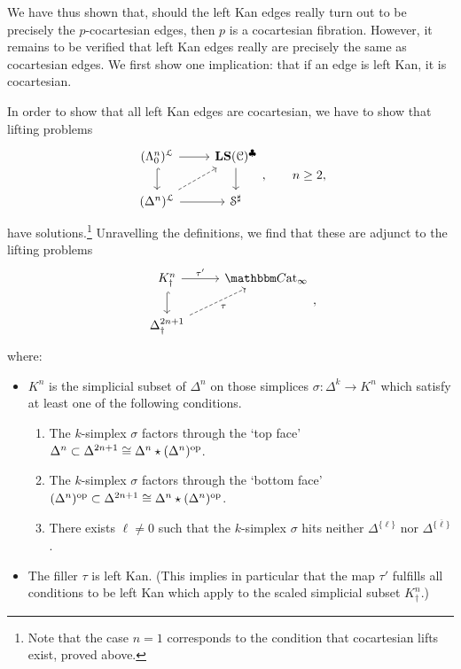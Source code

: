 \documentclass[main.tex]{subfiles}
\begin{document}
We have thus shown that, should the left Kan edges really turn out to be precisely the $p$-cocartesian edges, then $p$ is a cocartesian fibration. However, it remains to be verified that left Kan edges really are precisely the same as cocartesian edges. We first show one implication: that if an edge is left Kan, it is cocartesian.

In order to show that all left Kan edges are cocartesian, we have to show that lifting problems
\begin{equation*}
  \begin{tikzcd}
    (\Lambda^{n}_{0})^{\mathcal{L}}
    \arrow[r]
    \arrow[d, hook]
    & \LS(\category{C})^{\clubsuit}
    \arrow[d]
    \\
    (\Delta^{n})^{\mathcal{L}}
    \arrow[r]
    \arrow[ur, dashed]
    & \S^{\sharp}
  \end{tikzcd},\qquad n \geq 2,
\end{equation*}
have solutions.\footnote{Note that the case $n=1$ corresponds to the condition that cocartesian lifts exist, proved above.} Unravelling the definitions, we find that these are adjunct to the lifting problems
\begin{equation}
  \label{eq:challenging_filling_problem}
  \begin{tikzcd}
    K^{n}_{\dagger}
    \arrow[d, hook]
    \arrow[r, "\tau'"]
    & \ICCat
    \\
    \Delta^{2n+1}_{\dagger}
    \arrow[ur, dashed, swap, "\tau"]
  \end{tikzcd},
\end{equation}
where:
\begin{itemize}
  \item $K^{n}$ is the simplicial subset of $\Delta^{n}$ on those simplices $\sigma\colon \Delta^{k} \to K^{n}$ which satisfy at least one of the following conditions.
    \begin{enumerate}
      \item The $k$-simplex $\sigma$ factors through the `top face' $\Delta^{n} \subset \Delta^{2n+1} \cong \Delta^{n} \star (\Delta^{n})^{\mathrm{op}}$.

      \item The $k$-simplex $\sigma$ factors through the `bottom face' $(\Delta^{n})^{\mathrm{op}} \subset \Delta^{2n+1} \cong \Delta^{n} \star (\Delta^{n})^{\mathrm{op}}$.

      \item There exists $\ell \neq 0$ such that the $k$-simplex $\sigma$ hits neither $\Delta^{\{\ell\}}$ nor $\Delta^{\{\overline{\ell}\}}$.
    \end{enumerate}


  \item The filler $\tau$ is left Kan. (This implies in particular that the map $\tau'$ fulfills all conditions to be left Kan which apply to the scaled simplicial subset $K^{n}_{\dagger}$.)
\end{itemize}
\end{document}
